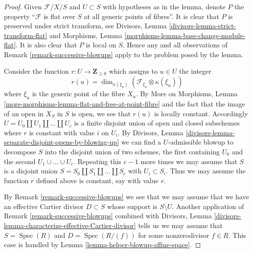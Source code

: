 \documentclass[10pt,a4paper]{amsart}
\theoremstyle{plain}
\theoremstyle{definition}
\theoremstyle{remark}
\numberwithin{equation}{subsection}
\def\Spec{\mathop{\mathrm{Spec}}}
\begin{document}
\begin{proof}
Given $\mathcal{F}/X/S$ and $U \subset S$ with hypotheses as
in the lemma, denote $P$ the property ``$\mathcal{F}$ is flat over $S$ at
all generic points of fibres''. It is clear that $P$ is preserved under
strict transform, see
Divisors, Lemma \ref{divisors-lemma-strict-transform-flat}
and Morphisms, Lemma \ref{morphisms-lemma-base-change-module-flat}.
It is also clear that $P$ is local on $S$. Hence any and all observations
of Remark \ref{remark-successive-blowups} apply to the problem posed by
the lemma.

\medskip\noindent
Consider the function $r : U \to \mathbf{Z}_{\geq 0}$ which assigns to
$u \in U$ the integer
$$
r(u) = \dim_{\kappa(\xi_u)}(\mathcal{F}_{\xi_u} \otimes \kappa(\xi_u))
$$
where $\xi_u$ is the generic point of the fibre $X_u$.
By More on Morphisms, Lemma
\ref{more-morphisms-lemma-flat-and-free-at-point-fibre}
and the fact that the image of an open in $X_S$ in $S$ is open,
we see that $r(u)$ is locally constant. Accordingly
$U = U_0 \amalg U_1 \amalg \ldots \amalg U_c$ is a finite disjoint
union of open and closed subschemes where $r$ is constant with value
$i$ on $U_i$. By
Divisors, Lemma \ref{divisors-lemma-separate-disjoint-opens-by-blowing-up}
we can find a $U$-admissible blowup to decompose $S$ into
the disjoint union of two schemes, the first containing $U_0$ and
the second $U_1 \cup \ldots \cup U_c$. Repeating this $c - 1$
more times we may assume that $S$ is a disjoint union
$S = S_0 \amalg S_1 \amalg \ldots \amalg S_c$ with $U_i \subset S_i$.
Thus we may assume the function $r$ defined above is constant, say
with value $r$.

\medskip\noindent
By Remark \ref{remark-successive-blowups} we see that we may assume that
we have an effective Cartier divisor $D \subset S$ whose support is
$S \setminus U$. Another application of Remark \ref{remark-successive-blowups}
combined with
Divisors, Lemma \ref{divisors-lemma-characterize-effective-Cartier-divisor}
tells us we may assume that
$S = \Spec(R)$ and $D = \Spec(R/(f))$ for some nonzerodivisor
$f \in R$. This case is handled by
Lemma \ref{lemma-helper-blowup-affine-space}.
\end{proof}
\end{document}

